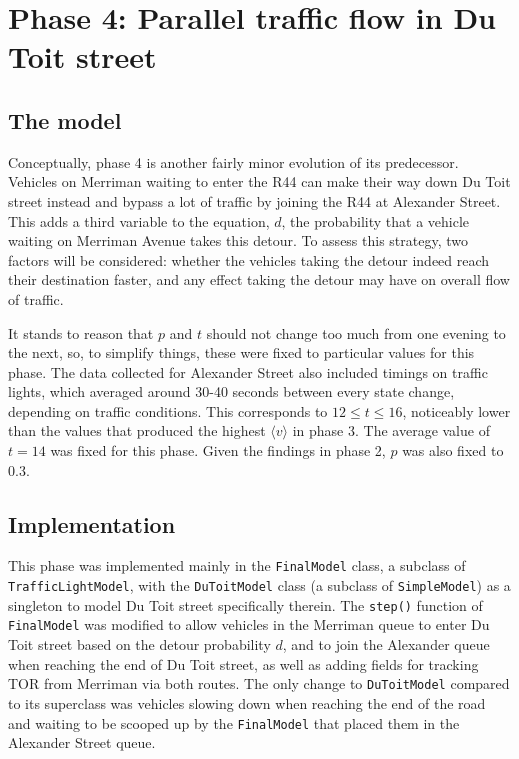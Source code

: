 \documentclass{article}
\begin{document}
\section*{Phase 4: Parallel traffic flow in Du Toit street}

\subsection*{The model}

Conceptually, phase 4 is another fairly minor evolution of its predecessor. Vehicles on Merriman waiting to enter the R44 can make their way down Du Toit street instead and bypass a lot of traffic by joining the R44 at Alexander Street. This adds a third variable to the equation, $d$, the probability that a vehicle waiting on Merriman Avenue takes this detour. To assess this strategy, two factors will be considered: whether the vehicles taking the detour indeed reach their destination faster, and any effect taking the detour may have on overall flow of traffic.

It stands to reason that $p$ and $t$ should not change too much from one evening to the next, so, to simplify things, these were fixed to particular values for this phase. The data collected for Alexander Street also included timings on traffic lights, which averaged around 30-40 seconds between every state change, depending on traffic conditions. This corresponds to $12 \leq t \leq 16$, noticeably lower than the values that produced the highest $\langle v \rangle$ in phase 3. The average value of $t=14$ was fixed for this phase. Given the findings in phase 2, $p$ was also fixed to 0.3.

\subsection*{Implementation}

This phase was implemented mainly in the \texttt{FinalModel} class, a subclass of \texttt{TrafficLightModel}, with the \texttt{DuToitModel} class (a subclass of \texttt{SimpleModel}) as a singleton to model Du Toit street specifically therein. The \texttt{step()} function of \texttt{FinalModel} was modified to allow vehicles in the Merriman queue to enter Du Toit street based on the detour probability $d$, and to join the Alexander queue when reaching the end of Du Toit street, as well as adding fields for tracking TOR from Merriman via both routes. The only change to \texttt{DuToitModel} compared to its superclass was vehicles slowing down when reaching the end of the road and waiting to be scooped up by the \texttt{FinalModel} that placed them in the Alexander Street queue.
\end{document}
